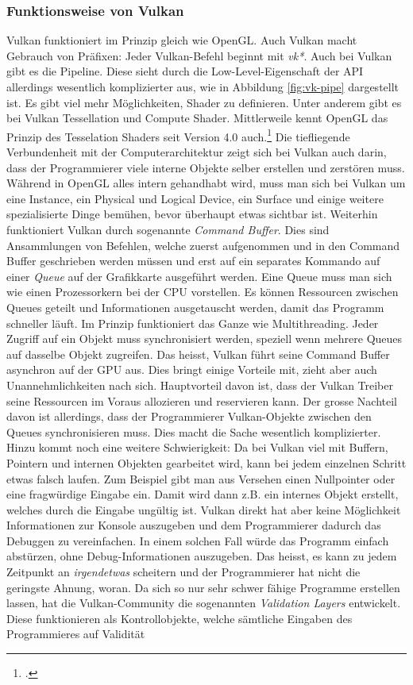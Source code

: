 \documentclass[titlepage, 11pt, a4paper, ngerman]{article}
\begin{document}
\subsubsection{Funktionsweise von Vulkan}
Vulkan funktioniert im Prinzip gleich wie \acrshort{OpenGL}. Auch Vulkan macht Gebrauch von Präfixen: Jeder Vulkan-Befehl beginnt mit \textit{vk*}. Auch bei Vulkan gibt es die Pipeline. Diese sieht durch die Low-Level-Eigenschaft der \acrshort{API} allerdings wesentlich komplizierter aus, wie in Abbildung \ref{fig:vk-pipe} dargestellt ist. Es gibt viel mehr Möglichkeiten, \gls{Shader} zu definieren. Unter anderem gibt es bei Vulkan Tessellation und Compute \gls{Shader}. Mittlerweile kennt \acrshort{OpenGL} das Prinzip des Tesselation \gls{Shader}s seit Version 4.0 auch.\footcite{oglwiki-tessellation} Die tiefliegende Verbundenheit mit der Computerarchitektur zeigt sich bei Vulkan auch darin, dass der Programmierer viele interne Objekte selber erstellen und zerstören muss. Während in \acrshort{OpenGL} alles intern gehandhabt wird, muss man sich bei Vulkan um eine Instance, ein Physical und Logical Device, ein Surface und einige weitere spezialisierte Dinge bemühen, bevor überhaupt etwas sichtbar ist. Weiterhin funktioniert Vulkan durch sogenannte \textit{Command Buffer}. Dies sind Ansammlungen von Befehlen, welche zuerst aufgenommen und in den Command Buffer geschrieben werden müssen und erst auf ein separates Kommando auf einer \textit{Queue} auf der Grafikkarte ausgeführt werden. Eine Queue muss man sich wie einen Prozessorkern bei der \acrshort{CPU} vorstellen. Es können Ressourcen zwischen Queues geteilt und Informationen ausgetauscht werden, damit das Programm schneller läuft. Im Prinzip funktioniert das Ganze wie \gls{Multithreading}. Jeder Zugriff auf ein Objekt muss synchronisiert werden, speziell wenn mehrere Queues auf dasselbe Objekt zugreifen. Das heisst, Vulkan führt seine Command Buffer asynchron auf der GPU aus. Dies bringt einige Vorteile mit, zieht aber auch Unannehmlichkeiten nach sich. Hauptvorteil davon ist, dass der Vulkan Treiber seine Ressourcen im Voraus allozieren und reservieren kann. Der grosse Nachteil davon ist allerdings, dass der Programmierer Vulkan-Objekte zwischen den Queues synchronisieren muss. Dies macht die Sache wesentlich komplizierter. Hinzu kommt noch eine weitere Schwierigkeit: Da bei Vulkan viel mit Buffern, Pointern und internen Objekten gearbeitet wird, kann bei jedem einzelnen Schritt etwas falsch laufen. Zum Beispiel gibt man aus Versehen einen Nullpointer oder eine fragwürdige Eingabe ein. Damit wird dann z.B. ein internes Objekt erstellt, welches durch die Eingabe ungültig ist. Vulkan direkt hat aber keine Möglichkeit Informationen zur Konsole auszugeben und dem Programmierer dadurch das Debuggen zu vereinfachen. In einem solchen Fall würde das Programm einfach abstürzen, ohne Debug-Informationen auszugeben. Das heisst, es kann zu jedem Zeitpunkt an \textit{irgendetwas} scheitern und der Programmierer hat nicht die geringste Ahnung, woran. Da sich so nur sehr schwer fähige Programme erstellen lassen, hat die Vulkan-Community die sogenannten \textit{Validation Layers} entwickelt. Diese funktionieren als Kontrollobjekte, welche sämtliche Eingaben des Programmieres auf Validität 
\end{document}
